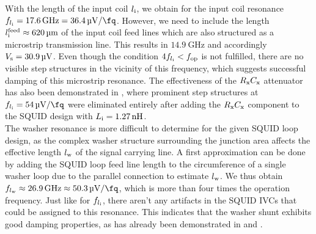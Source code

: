 
With the length of the input coil $l_{\rm i}$, we obtain for the input coil resonance \\ $f_{l_{\rm i}}=\qty{17.6}{\GHz}=\qty{36.4}{\uV\per\fq}$. However, we need to include the length $l_{\rm i}^{\rm feed}\approx \qty{620}{\um}$ of the input coil feed lines which are also structured as a microstrip transmission line. This results in $\qty{14.9}{\GHz}$ and accordingly $V_{\rm s}=\qty{30.9}{\uV}$. Even though the condition $4f_{l_{\rm i}}<f_{\rm op}$ is not fulfilled, there are no visible step structures in the vicinity of this frequency, which suggests successful damping of this microstrip resonance. The effectiveness of the $R_{\rm x}C_{\rm x}$ attenuator has also been demonstrated in \cite{Bauer2022}, where prominent step structures at $f_{l_{\rm i}}=\qty{54}{\uV\per\fq}$ were eliminated entirely after adding the $R_{\rm x}C_{\rm x}$ component to the SQUID design with $L_{\rm i}=\qty{1.27}{\nH}$. \\
The washer resonance is more difficult to determine for the given SQUID loop design, as the complex washer structure surrounding the junction area affects the effective length $l_{\rm w}$ of the signal carrying line. A first approximation can be done by adding the SQUID loop feed line length to the circumference of a single washer loop due to the parallel connection to estimate $l_{\rm w}$. We thus obtain $f_{l_{\rm w}}\approx\qty{26.9}{\GHz}\approx\qty{50.3}{\uV\per\fq}$, which is more than four times the operation frequency. Just like for $f_{l_{\rm i}}$, there aren't any artifacts in the SQUID IVCs that could be assigned to this resonance. This indicates that the washer shunt exhibits good damping properties, as has already been demonstrated in \cite{Richter2017} and \cite{Bauer2018}.



